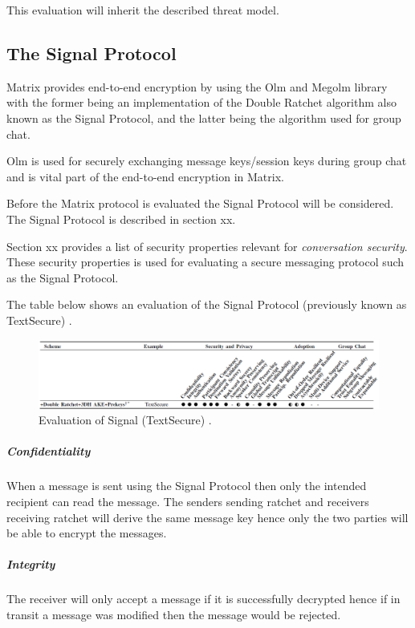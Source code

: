 This evaluation will inherit the described threat model.

\subsection{The Signal Protocol}
Matrix provides end-to-end encryption by using the Olm and Megolm library with the former being an implementation of the Double Ratchet algorithm also known as the Signal Protocol, and the latter being the algorithm used for group chat. 

Olm is used for securely exchanging message keys/session keys during group chat and is vital part of the end-to-end encryption in Matrix.

Before the Matrix protocol is evaluated the Signal Protocol will be considered. The Signal Protocol is described in section xx. 

Section xx provides a list of security properties relevant for \emph{conversation security}. These security properties is used for evaluating a secure messaging protocol such as the Signal Protocol.

The table below shows an evaluation of the Signal Protocol (previously known as TextSecure) \cite{sok}. 

\begin{figure}[H]
	\hspace*{-1.7cm} 
	\centering
	\includegraphics[width=16cm]{figures/framework_signal.png}
	\caption{Evaluation of Signal (TextSecure) \cite{sok}.}
	\label{fig:framework_signal}
\end{figure}




\subparagraph{Confidentiality} When a message is sent using the Signal Protocol then only the intended recipient can read the message. The senders sending ratchet and receivers receiving ratchet will derive the same message key hence only the two parties will be able to encrypt the messages. 

\subparagraph{Integrity} The receiver will only accept a message if it is successfully decrypted hence if in transit a message was modified then the message would be rejected.

